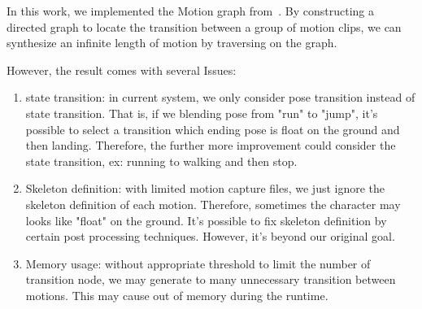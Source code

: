 In this work, we implemented the Motion graph from~\cite{kovar2002}. By constructing a 
directed graph to locate the transition between a group of motion clips, we can 
synthesize an infinite length of motion by traversing on the graph. 


However, the result comes with several Issues:
\begin{enumerate}
\item state transition: in current system, we only consider pose transition instead of state transition. 
That is, if we blending pose from "run" to "jump", it's possible to select a transition which ending pose is 
float on the ground and then landing. Therefore, the further more improvement could consider the state 
transition, ex: running to walking and then stop. 

\item Skeleton definition: with limited motion capture files, we just ignore the skeleton 
definition of each motion. Therefore, sometimes the character may looks like 
"float" on the ground. It's possible to fix skeleton definition by certain post processing 
techniques. However, it's beyond our original goal.

\item Memory usage: without appropriate threshold to limit the number of transition node, we may 
generate to many unnecessary transition between motions. This may cause out of memory during the runtime. 
\end{enumerate}